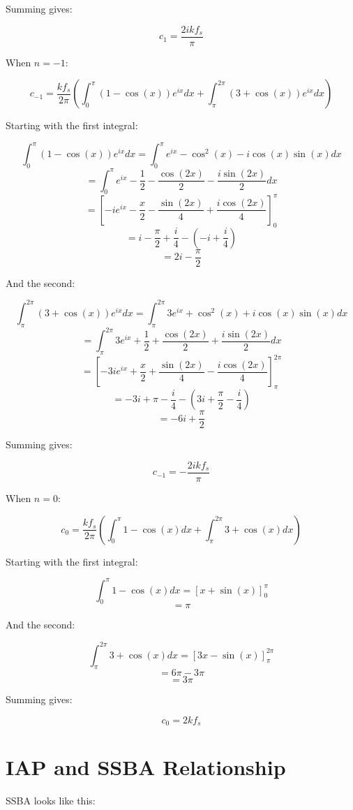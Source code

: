 \documentclass[a4paper]{article}
\begin{document}
	Summing gives:

	\[ \boxed{c_{1} = \frac{2ikf_{s}}{\pi}} \]

	When $n = -1$:

	\[ c_{-1} = \frac{kf_{s}}{2\pi} \left( \int_{0}^{\pi} (1-\cos(x))e^{ix} dx
				              + \int_{\pi}^{2\pi} (3 + \cos(x))e^{ix} dx 
			                      \right) \]

	Starting with the first integral:
	
	\[ \int_{0}^{\pi} (1-\cos(x))e^{ix} dx = \int_{0}^{\pi} e^{ix} - \cos^{2}(x) - i\cos(x)\sin(x) dx \]
	\[ = \int_{0}^{\pi} e^{ix} - \frac{1}{2} - \frac{\cos(2x)}{2} - \frac{i\sin(2x)}{2} dx \]
	\[ = \left[ -ie^{ix} - \frac{x}{2} - \frac{\sin(2x)}{4} + \frac{i\cos(2x)}{4} \right]_{0}^{\pi} \]
	\[ = i - \frac{\pi}{2} + \frac{i}{4} - \left( -i + \frac{i}{4} \right) \]
	\[ = 2i - \frac{\pi}{2} \]

	And the second:
	
	\[ \int_{\pi}^{2\pi} (3+\cos(x))e^{ix} dx = \int_{\pi}^{2\pi} 3e^{ix} + \cos^{2}(x) + i\cos(x)\sin(x) dx \]
	\[ = \int_{\pi}^{2\pi} 3e^{ix} + \frac{1}{2} + \frac{\cos(2x)}{2} + \frac{i\sin(2x)}{2} dx \]
	\[ = \left[ -3ie^{ix} + \frac{x}{2} + \frac{\sin(2x)}{4} - \frac{i\cos(2x)}{4} \right]_{\pi}^{2\pi} \]
	\[ = -3i + \pi - \frac{i}{4} - \left( 3i + \frac{\pi}{2} - \frac{i}{4} \right) \]
	\[ = -6i + \frac{\pi}{2} \]

	Summing gives:

	\[ \boxed{c_{-1} = -\frac{2ikf_{s}}{\pi}} \]

	When $n = 0$:

	\[ c_{0} = \frac{kf_{s}}{2\pi} \left( \int_{0}^{\pi} 1-\cos(x) dx
				              + \int_{\pi}^{2\pi} 3 + \cos(x) dx 
			                      \right) \]

	Starting with the first integral:

	\[ \int_{0}^{\pi} 1 - \cos(x) dx = \left[ x + \sin(x) \right]_{0}^{\pi}\]
	\[ = \pi \]

	And the second:

	\[ \int_{\pi}^{2\pi} 3 + \cos(x) dx = \left[ 3x - \sin(x) \right]_{\pi}^{2\pi}\]
	\[ = 6\pi - 3\pi \]
	\[ = 3\pi \]

	Summing gives:

	\[ \boxed{c_{0} = 2kf_{s}} \]

\section{IAP and SSBA Relationship}
	SSBA looks like this:
\end{document}
